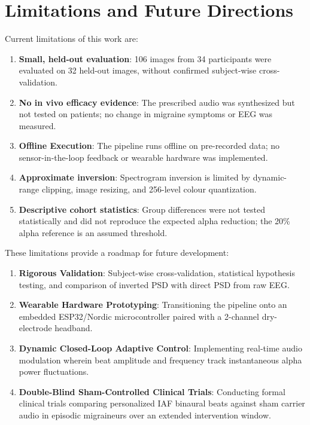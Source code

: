 \documentclass[12pt, a4paper]{report}
\begin{document}
\section{Limitations and Future Directions}
\label{sec:future_directions}
Current limitations of this work are:
\begin{enumerate}
    \item \textbf{Small, held-out evaluation}: 106 images from 34 participants were evaluated on 32 held-out images, without confirmed subject-wise cross-validation.
    \item \textbf{No in vivo efficacy evidence}: The prescribed audio was synthesized but not tested on patients; no change in migraine symptoms or EEG was measured.
    \item \textbf{Offline Execution}: The pipeline runs offline on pre-recorded data; no sensor-in-the-loop feedback or wearable hardware was implemented.
    \item \textbf{Approximate inversion}: Spectrogram inversion is limited by dynamic-range clipping, image resizing, and 256-level colour quantization.
    \item \textbf{Descriptive cohort statistics}: Group differences were not tested statistically and did not reproduce the expected alpha reduction; the 20\% alpha reference is an assumed threshold.
\end{enumerate}
These limitations provide a roadmap for future development:
\begin{enumerate}
    \item \textbf{Rigorous Validation}: Subject-wise cross-validation, statistical hypothesis testing, and comparison of inverted PSD with direct PSD from raw EEG.
    \item \textbf{Wearable Hardware Prototyping}: Transitioning the pipeline onto an embedded ESP32/Nordic microcontroller paired with a 2-channel dry-electrode headband.
    \item \textbf{Dynamic Closed-Loop Adaptive Control}: Implementing real-time audio modulation wherein beat amplitude and frequency track instantaneous alpha power fluctuations.
    \item \textbf{Double-Blind Sham-Controlled Clinical Trials}: Conducting formal clinical trials comparing personalized IAF binaural beats against sham carrier audio in episodic migraineurs over an extended intervention window.
\end{enumerate}
\end{document}
